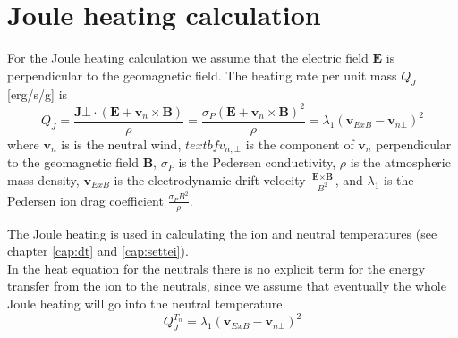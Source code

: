 %
\section{Joule heating calculation}
%
For the Joule heating calculation we assume that the electric field 
$\textbf{E}$ is perpendicular to the geomagnetic field.  The heating
rate per unit mass $Q_J$ [erg/s/g] is
%
\begin{equation}
  Q_J = \frac{\textbf{J}{\bot} \cdot
  (\textbf{E} + \textbf{v}_n \times \textbf{B})}{\rho} =
  \frac{\sigma_P (\textbf{E} + \textbf{v}_n \times \textbf{B})^2}{\rho} =
  \lambda_1 (\textbf{v}_{ExB}- \textbf{v}_{n\bot})^2
\end{equation}
%
where $\textbf{v}_n$ is is the neutral wind,
$textbf{v}_{n,\bot}$ is the component of $\textbf{v}_n$ 
perpendicular to the geomagnetic field \textbf{B}, 
$\sigma_P$ is the Pedersen conductivity,
$\rho$ is the atmospheric mass density,
$\textbf{v}_{ExB}$ is the electrodynamic drift velocity
$\frac{\textbf{E} \times \textbf{B}}{B^2}$, and
$\lambda_1$ is the Pedersen ion drag coefficient
$\frac{\sigma_P B^2}{\rho}$.

The Joule heating is used in calculating the ion and
neutral temperatures (see chapter \ref{cap:dt} and \ref{cap:settei}).
\\

In the heat equation for the neutrals there is no explicit term for
the energy transfer from the ion to the neutrals, since we assume
that eventually the whole Joule heating will go into the neutral
temperature.
%
\begin{equation}
  Q_J^{T_n} =
  \lambda_1 (\textbf{v}_{ExB}- \textbf{v}_{n\bot})^2
\end{equation}
%

